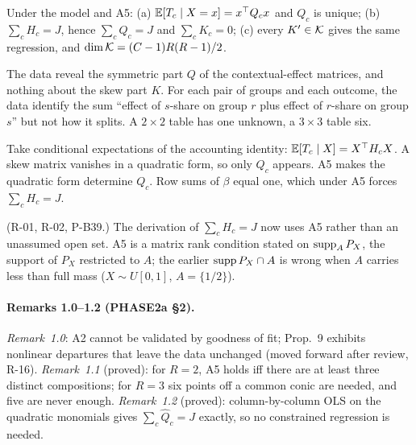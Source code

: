 \begin{result}\label{res:p2a-l1}
 Under the model and A5: (a) $\mathbb E[T_c\mid X=x]=x^\top Q_cx$ and
$Q_c$ is unique; (b) $\sum_cH_c=J$, hence $\sum_cQ_c=J$ and $\sum_cK_c=0$;
(c) every $K'\in\mathcal K$ gives the same regression, and
$\dim\mathcal K=(C-1)R(R-1)/2$.
\end{result}
\begin{plain}
The data reveal the symmetric part $Q$ of the contextual-effect matrices, and
nothing about the skew part $K$. For each pair of groups and each outcome, the
data identify the sum ``effect of $s$-share on group $r$ plus effect of $r$-share
on group $s$'' but not how it splits. A $2\times2$ table has one unknown, a
$3\times3$ table six.
\end{plain}
\begin{sketch}
Take conditional expectations of the accounting identity: $\mathbb E[T_c\mid X]=X^\top
H_cX$. A skew matrix vanishes in a quadratic form, so only $Q_c$ appears. A5
makes the quadratic form determine $Q_c$. Row sums of $\beta$ equal one, which
under A5 forces $\sum_cH_c=J$.
\end{sketch}
\begin{revnote}
(R-01, R-02, P-B39.) The derivation of $\sum_cH_c=J$ now uses A5 rather than an
unassumed open set. A5 is a matrix rank condition stated on
$\operatorname{supp}_AP_X$, the support of $P_X$ restricted to $A$; the earlier
$\operatorname{supp} P_X\cap A$ is wrong when $A$ carries less than full mass
($X\sim U[0,1]$, $A=\{1/2\}$).
\end{revnote}

\paragraph{Remarks 1.0--1.2 (PHASE2a \S2).} \emph{Remark~1.0}: A2 cannot be
validated by goodness of fit; Prop.~9 exhibits nonlinear departures that leave
the data unchanged (moved forward after review, R-16). \emph{Remark~1.1}
(proved): for $R=2$, A5 holds iff there are at least three distinct
compositions; for $R=3$ six points off a common conic are needed, and five are
never enough. \emph{Remark~1.2} (proved): column-by-column OLS on the quadratic
monomials gives $\sum_c\hat Q_c=J$ exactly, so no constrained regression is
needed.

